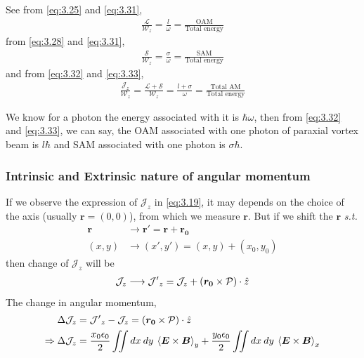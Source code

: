 \documentclass[11pt,a4paper]{article}
\numberwithin{equation}{section}
\begin{document}
See from \ref{eq:3.25} and \ref{eq:3.31}, 
\begin{align}
	\frac{\mathcal{L}}{\mathcal{W}_z} = \frac{l}{\omega} =\frac{\text{OAM}}{\text{Total energy}} \label{eq:3.32}
\end{align}
from \ref{eq:3.28} and \ref{eq:3.31},
\begin{align}
	\frac{\mathcal{S}}{\mathcal{W}_z} = \frac{\sigma}{\omega} =\frac{\text{SAM}}{\text{Total energy}}\label{eq:3.33}
\end{align}
and from \ref{eq:3.32} and \ref{eq:3.33},
\begin{align}
	\frac{\mathcal{J}_z}{\mathcal{W}_z} = \frac{\mathcal{L}+\mathcal{S}}{\mathcal{W}_z} = \frac{l+\sigma}{\omega} =\frac{\text{Total AM}}{\text{Total energy}} \label{eq:3.34}
\end{align}

We know for a photon the energy associated with it is $\hbar\omega$, then from \ref{eq:3.32} and \ref{eq:3.33}, we can say, the OAM associated with one photon of paraxial vortex beam is $l\hbar$ and SAM associated with one photon is $\sigma\hbar$.

\subsubsection{Intrinsic and Extrinsic nature of angular momentum}
If we observe the expression of $\mathcal{J}_z$ in \ref{eq:3.19}, it may depends on the choice of the axis (usually $\boldsymbol{r} = (0,0) $), from which we measure $\boldsymbol{r}$. \cite{WO}\cite{berry 98} But if we shift the $\boldsymbol{r}$ \textit{s.t.}
\begin{align}
	\boldsymbol{r}&\longrightarrow\boldsymbol{r'}=\boldsymbol{r}+\boldsymbol{r_0}\\
	(x,y)&\longrightarrow(x',y')=(x,y)+(x_0,y_0)
\end{align}
then change of $\mathcal{J}_z$ will be
\begin{align}
	\mathcal{J}_z\longrightarrow\mathcal{J'}_z = \mathcal{J}_z +  (\boldsymbol{r_0}\times\mathcal{P})\cdot\Hat{z}
\end{align}
The change in angular momentum,
\begin{align}
	\Delta\mathcal{J}_z&= \mathcal{J'}_z-\mathcal{J}_z = (\boldsymbol{r_0}\times\mathcal{P})\cdot\Hat{z}\\
	\Rightarrow\Delta\mathcal{J}_z&= \frac{x_0\epsilon_0}{2}\iint  dx\:dy\: \expval{\boldsymbol{E}\times\boldsymbol{B}}_y + \frac{y_0\epsilon_0}{2}\iint  dx\:dy\: \expval{\boldsymbol{E}\times\boldsymbol{B}}_x \label{}
\end{align}
\end{document}

